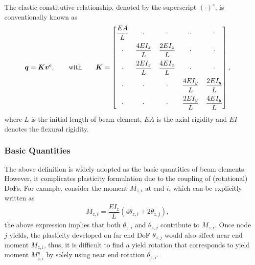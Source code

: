The elastic constitutive relationship, denoted by the superscript $\left(\cdot\right)^e$, is conventionally known as
\begin{gather}
\bm{q}=\bm{K}\bm{v}^e,\qquad\text{with}\qquad\bm{K}=\begin{bmatrix}
\dfrac{EA}{L}&\cdot&\cdot&\cdot&\cdot\\[3mm]
\cdot&\dfrac{4EI_z}{L}&\dfrac{2EI_z}{L}&\cdot&\cdot\\[3mm]
\cdot&\dfrac{2EI_z}{L}&\dfrac{4EI_z}{L}&\cdot&\cdot\\[3mm]
\cdot&\cdot&\cdot&\dfrac{4EI_y}{L}&\dfrac{2EI_y}{L}\\[3mm]
\cdot&\cdot&\cdot&\dfrac{2EI_y}{L}&\dfrac{4EI_y}{L}
\end{bmatrix},
\end{gather}
where $L$ is the initial length of beam element, $EA$ is the axial rigidity and $EI$ denotes the flexural rigidity.
\subsubsection{Basic Quantities}
The above definition is widely adopted as the basic quantities of beam elements.
However, it complicates plasticity formulation due to the coupling of (rotational) DoFs. For example, consider the moment $M_{z,i}$ at end $i$, which can be explicitly written as
\begin{gather}\label{eq:redefine}
M_{z,i}=\dfrac{EI_z}{L}\left(4\theta_{z,i}+2\theta_{z,j}\right),
\end{gather}
the above expression implies that both $\theta_{z,i}$ and $\theta_{z,j}$ contribute to $M_{z,i}$.
Once node $j$ yields, the plasticity developed on far end DoF $\theta_{z,j}$ would also affect near end moment $M_{z,i}$, thus, it is difficult to find a yield rotation that corresponds to yield moment $M^y_{z,i}$ by solely using near end rotation $\theta_{z,i}$.


